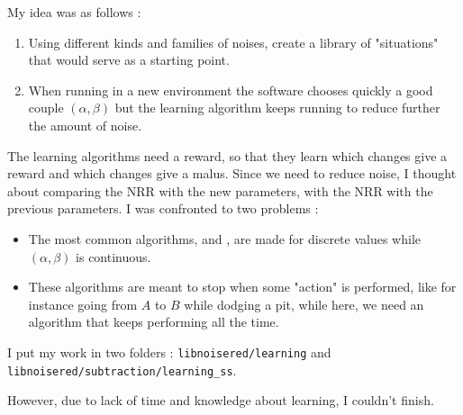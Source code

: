 My idea was as follows : 
\begin{enumerate}
\item Using different kinds and families of noises, create a library of "situations" that would serve as a starting point.
\item When running in a new environment the software chooses quickly a good couple $(\alpha, \beta)$ but the learning algorithm keeps running to reduce further the amount of noise.
\end{enumerate}

The learning algorithms need a reward, so that they learn which changes give a reward and which changes give a malus.
Since we need to reduce noise, I thought about comparing the \ac{NRR} with the new parameters, with the \ac{NRR} with the previous parameters.
I was confronted to two problems : 
\begin{itemize}
\item The most common algorithms, \cite{watkins1992q} and \cite{rummery1994line}, are made for discrete values while  $(\alpha, \beta)$ is continuous.
\item These algorithms are meant to stop when some "action" is performed, like for instance going from $A$ to $B$ while dodging a pit, while here, we need an algorithm that keeps performing all the time.
\end{itemize}

I put my work in two folders : \texttt{libnoisered/learning} and \texttt{libnoisered/subtraction/learning\_ss}.

However, due to lack of time and knowledge about learning, I couldn't finish.

